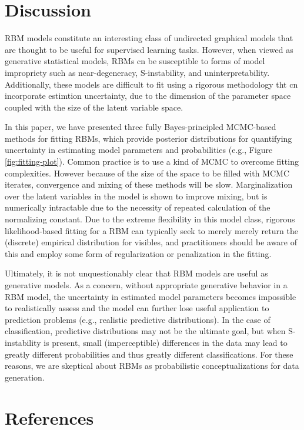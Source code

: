 \documentclass[]{article}
\theoremstyle{definition}
\begin{document}
\hypertarget{discussion}{%
\section{Discussion}\label{discussion}}

RBM models constitute an interesting class of undirected graphical
models that are thought to be useful for supervised learning tasks.
However, when viewed as generative statistical models, RBMs cn be
susceptible to forms of model impropriety such as near-degeneracy,
S-instability, and uninterpretability. Additionally, these models are
difficult to fit using a rigorous methodology tht cn incorporate
estimtion uncertainty, due to the dimension of the parameter space
coupled with the size of the latent variable space.

In this paper, we have presented three fully Bayes-principled MCMC-based
methods for fitting RBMs, which provide posterior distributions for
quantifying uncertainty in estimating model parameters and probabilities
(e.g., Figure \ref{fig:fitting-plot}). Common practice is to use a kind
of MCMC to overcome fitting complexities. However because of the size of
the space to be filled with MCMC iterates, convergence and mixing of
these methods will be slow. Marginalization over the latent variables in
the model is shown to improve mixing, but is numerically intractable due
to the necessity of repeated calculation of the normalizing constant.
Due to the extreme flexibility in this model class, rigorous
likelihood-based fitting for a RBM can typically seek to merely merely
return the (discrete) empirical distribution for visibles, and
practitioners should be aware of this and employ some form of
regularization or penalization in the fitting.

Ultimately, it is not unquestionably clear that RBM models are useful as
generative models. As a concern, without appropriate generative behavior
in a RBM model, the uncertainty in estimated model parameters becomes
impossible to realistically assess and the model can further lose useful
application to prediction problems (e.g., realistic predictive
distributions). In the case of classification, predictive distributions
may not be the ultimate goal, but when S-instability is present, small
(imperceptible) differences in the data may lead to greatly different
probabilities and thus greatly different classifications. For these
reasons, we are skeptical about RBMs as probabilistic conceptualizations
for data generation.

\hypertarget{references}{%
\section*{References}\label{references}}
\end{document}
